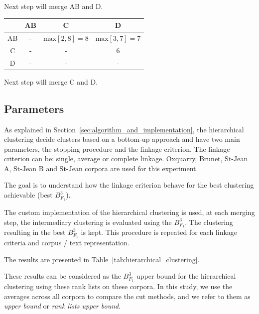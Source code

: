 \begin{example}
  \vspace{0.2cm}

  Next step will merge AB and D.

  \vspace{0.5cm}

  \begin{subexample}{\linewidth}
    \centering
    \begin{tabular}{c|c c c}
      \toprule
        & AB & C & D \\
      \midrule
      AB & - & $\text{max} \left[2, 8 \right] = 8$ & $\text{max} \left[3, 7 \right] = 7$ \\
      C  & - & - & 6 \\
      D  & - & - & - \\
      \bottomrule
    \end{tabular}
  \end{subexample}

  \vspace{0.2cm}

  Next step will merge C and D.
\end{example}


\subsection{Parameters\label{sec:hierarchical_clustering}}

As explained in Section~\ref{sec:algorithm_and_implementation}, the hierarchical clustering decide clusters based on a bottom-up approach and have two main parameters, the stopping procedure and the linkage criterion.
The linkage criterion can be: single, average or complete linkage.
Oxquarry, Brunet, St-Jean A, St-Jean B and St-Jean corpora are used for this experiment.

The goal is to understand how the linkage criterion behave for the best clustering achievable (best $B^3_{F_1}$).

The custom implementation of the hierarchical clustering is used, at each merging step, the intermediary clustering is evaluated using the $B^3_{F_1}$.
The clustering resulting in the best $B^3_{F_1}$ is kept.
This procedure is repeated for each linkage criteria and corpus / text representation.

The results are presented in Table~\ref{tab:hierarchical_clustering}.

These results can be considered as the $B^3_{F_1}$ upper bound for the hierarchical clustering using these rank lists on these corpora.
In this study, we use the averages across all corpora to compare the cut methods, and we refer to them as \textit{upper bound} or \textit{rank lists upper bound}.

